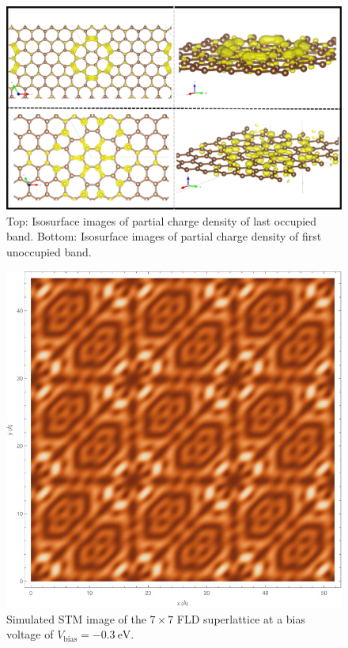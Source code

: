 \documentclass{article}
\begin{document}
\begin{figure}[H]
  \centering
  \includegraphics[scale=0.4]{../figures/parchg_7x7.png}
  \caption{Top: Isosurface images of partial charge density of last occupied band. Bottom: Isosurface images of partial charge density of first unoccupied band.}
  \label{fig:7iso}
\end{figure}

\begin{figure}[H]
  \centering
  \includegraphics[scale=0.2]{../figures/stm_0.3.jpeg}
  \caption{Simulated STM image of the $7\times7$ FLD superlattice at a bias voltage of $V_{\text{bias}} = -0.3~\text{eV}$.}
  \label{fig:stm}
\end{figure}
\end{document}
